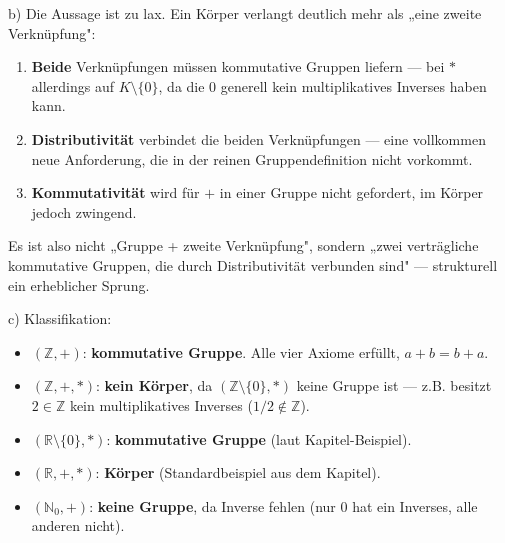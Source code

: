 \documentclass[11pt, a4paper]{article}
\begin{document}
b) Die Aussage ist zu lax. Ein Körper verlangt deutlich mehr als „eine zweite Verknüpfung":

\begin{enumerate}
  \item \textbf{Beide} Verknüpfungen müssen kommutative Gruppen liefern — bei $\ast$ allerdings auf $K \setminus \{0\}$, da die 0 generell kein multiplikatives Inverses haben kann.
  \item \textbf{Distributivität} verbindet die beiden Verknüpfungen — eine vollkommen neue Anforderung, die in der reinen Gruppendefinition nicht vorkommt.
  \item \textbf{Kommutativität} wird für $+$ in einer Gruppe nicht gefordert, im Körper jedoch zwingend.
\end{enumerate}

Es ist also nicht „Gruppe + zweite Verknüpfung", sondern „zwei verträgliche kommutative Gruppen, die durch Distributivität verbunden sind" — strukturell ein erheblicher Sprung.


c) Klassifikation:

\begin{itemize}
  \item $(\mathbb{Z}, +)$: \textbf{kommutative Gruppe}. Alle vier Axiome erfüllt, $a+b=b+a$.
  \item $(\mathbb{Z}, +, \ast)$: \textbf{kein Körper}, da $(\mathbb{Z} \setminus \{0\}, \ast)$ keine Gruppe ist — z.B. besitzt $2 \in \mathbb{Z}$ kein multiplikatives Inverses ($1/2 \notin \mathbb{Z}$).
  \item $(\mathbb{R} \setminus \{0\}, \ast)$: \textbf{kommutative Gruppe} (laut Kapitel-Beispiel).
  \item $(\mathbb{R}, +, \ast)$: \textbf{Körper} (Standardbeispiel aus dem Kapitel).
  \item $(\mathbb{N}_0, +)$: \textbf{keine Gruppe}, da Inverse fehlen (nur 0 hat ein Inverses, alle anderen nicht).
\end{itemize}




\end{document}
